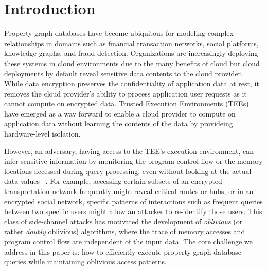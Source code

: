 \section{Introduction}

Property graph databases have become ubiquitous for modeling complex 
relationships in domains such as financial transaction networks, social 
platforms, knowledge graphs, and fraud detection. Organizations are increasingly 
deploying these systems in cloud environments due to the many benefits of
cloud but cloud deployments by default reveal sensitive data contents to the
cloud provider. While data encryption preserves the confidentiality of 
application data at rest, it removes the cloud provider's ability to process application 
user requests as it cannot compute on encrypted data. Trusted Execution 
Environments (TEEs) have emerged as a way forward to enable a cloud provider
to compute on application data without learning the contents of the data by provideing hardware-level isolation.

However, an adversary, having access to the TEE's execution environment, can 
infer sensitive information by monitoring the program control flow or the 
memory locations accessed during query processing, even without looking at the 
actual data values ~\cite{islam2012access, grubbs2019learning, kellaris2016generic, kornaropoulos2019data, cash2015leakage, demertzis2020seal, grubbs2018pump, gui2019encrypted, lacharite2018improved, oya2021hiding, poddar2020practical, zhang2016all, oya2022ihop}. For 
example, accessing certain subsets of an encrypted transportation network 
frequently might reveal critical routes or hubs, or in an encrypted social 
network, specific patterns of interactions such as frequent queries between two 
specific users might allow an attacker to re-identify those users. This class of 
side-channel attacks has motivated the development of \emph{oblivious} (or
rather \textit{doubly} oblivious) algorithms, where the trace of memory accesses 
and program control flow are independent of the input data. The core challenge 
we address in this paper is: how to efficiently execute property graph
database queries while maintaining oblivious access patterns.


